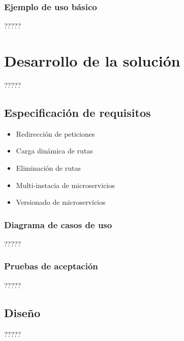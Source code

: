 \documentclass[11pt,spanish,listoffigures]{tfgetsinf}
\begin{document}
\subsection{Ejemplo de uso básico}

?????


\chapter{Desarrollo de la solución}

?????


\section{Especificación de requisitos}

\begin{itemize}

	\item Redirección de peticiones
	\item Carga dinámica de rutas
	\item Eliminación de rutas
	\item Multi-instacia de microservicios
	\item Versionado de microservicios

\end{itemize}

\subsection{Diagrama de casos de uso}

?????

\subsection{Pruebas de aceptación}

?????


\section{Diseño}

?????
\end{document}

